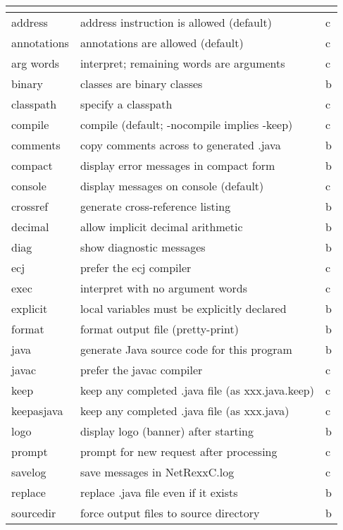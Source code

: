 \begin{longtable}[l]{|l|p{10cm}|l|}
\endlastfoot
\rowcolor[gray]{0.8} \bfseries \huge   & \normalsize  &  \\
\hline
address & address instruction is allowed (default) & c \\
\hline
annotations & annotations are allowed (default) & c \\
arg words & interpret; remaining words are arguments & c \\
\hline
binary &  classes are binary classes & b \\
\hline
 classpath  & specify a classpath & c \\
\hline
 compile  & compile (default; -nocompile implies -keep) & c \\
\hline
 comments     & copy comments across to generated .java &b \\
\hline
 compact      & display error messages in compact form &b \\
\hline
 console   & display messages on console (default) &c \\
\hline
 crossref     & generate cross-reference listing &b \\
\hline
 decimal      & allow implicit decimal arithmetic &b \\
\hline
 diag         & show diagnostic messages &b \\
\hline
 ecj        & prefer the ecj compiler &c \\
\hline
 exec        & interpret with no argument words &c \\
\hline
explicit     & local variables must be explicitly declared &b \\
\hline
format       & format output file (pretty-print) &b \\
\hline
 java         & generate Java source code for this program &b \\
\hline
 javac         & prefer the javac compiler &c \\
\hline
 keep         & keep any completed .java file (as xxx.java.keep) &c \\
\hline
keepasjava   & keep any completed .java file (as xxx.java) &c \\
\hline
 logo         & display logo (banner) after starting &b \\
\hline
prompt       & prompt for new request after processing &c \\
\hline
 savelog      & save messages in NetRexxC.log &c \\
\hline
 replace      & replace .java file even if it exists &b \\
\hline
 sourcedir    & force output files to source directory &b \\

\end{longtable}
